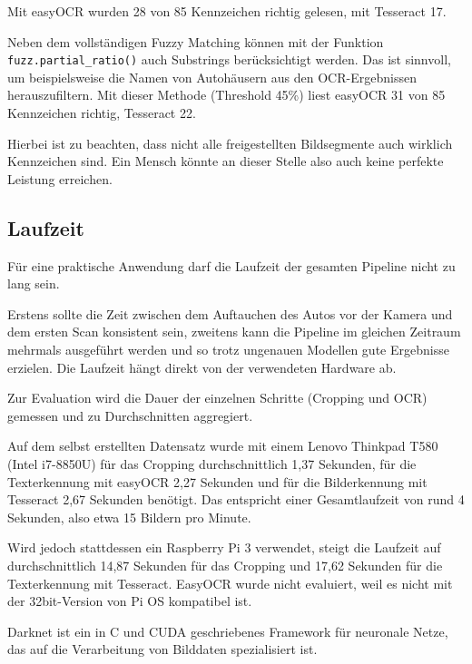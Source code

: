 Mit easyOCR wurden 28 von 85 Kennzeichen richtig gelesen, mit Tesseract 17.

Neben dem vollständigen Fuzzy Matching können mit der Funktion \lstinline{fuzz.partial_ratio()} auch Substrings berücksichtigt werden.
Das ist sinnvoll, um beispielsweise die Namen von Autohäusern aus den OCR-Ergebnissen herauszufiltern.
Mit dieser Methode (Threshold 45\%) liest easyOCR 31 von 85 Kennzeichen richtig, Tesseract 22.


Hierbei ist zu beachten, dass nicht alle freigestellten Bildsegmente auch wirklich Kennzeichen sind. Ein Mensch könnte an dieser Stelle also auch keine perfekte Leistung erreichen. 

\subsection{Laufzeit}

Für eine praktische Anwendung darf die Laufzeit der gesamten Pipeline nicht zu lang sein.

Erstens sollte die Zeit zwischen dem Auftauchen des Autos vor der Kamera und dem ersten Scan konsistent sein,
zweitens kann die Pipeline im gleichen Zeitraum mehrmals ausgeführt werden und so trotz ungenauen Modellen gute Ergebnisse erzielen.
Die Laufzeit hängt direkt von der verwendeten Hardware ab.

Zur Evaluation wird die Dauer der einzelnen Schritte (Cropping und OCR) gemessen und zu Durchschnitten aggregiert.

Auf dem selbst erstellten Datensatz wurde mit einem Lenovo Thinkpad T580 (Intel i7-8850U) für das Cropping durchschnittlich 1,37 Sekunden,
für die Texterkennung mit easyOCR 2,27 Sekunden und für die Bilderkennung mit Tesseract 2,67 Sekunden benötigt.
Das entspricht einer Gesamtlaufzeit von rund 4 Sekunden, also etwa 15 Bildern pro Minute.

Wird jedoch stattdessen ein Raspberry Pi 3 verwendet, steigt die Laufzeit auf durchschnittlich 14,87 Sekunden für das Cropping und 17,62 Sekunden für die Texterkennung mit Tesseract.
EasyOCR wurde nicht evaluiert, weil es nicht mit der 32bit-Version von Pi OS kompatibel ist.






	
	Darknet ist ein in C und CUDA geschriebenes Framework für neuronale Netze, das auf die Verarbeitung von Bilddaten spezialisiert ist. \autocite{darknet13}
	